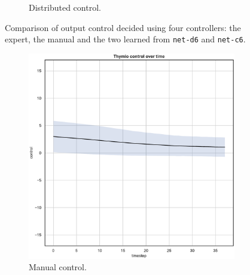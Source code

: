 \begin{figure}[!htb]
\begin{center}
\begin{subfigure}[h]{0.35\textwidth}
			\caption{Distributed control.}
		\end{subfigure}
	\end{center}
	\vspace{-0.5cm}
	\caption[Evaluation of the control decided by \texttt{net-c6}.]{Comparison of 
		output control decided using four controllers: the expert, the manual and the 
		two learned from \texttt{net-d6} and \texttt{net-c6}.}
\end{figure}

\medskip
\begin{figure}[!htb]\ContinuedFloat
	\begin{center}
		\begin{subfigure}[h]{0.35\textwidth}			
			\includegraphics[width=\textwidth]{contents/images/net-d6/control-overtime-manual}%
			\caption{Manual control.}
		\end{subfigure}
		\hspace{1cm}
		\begin{subfigure}[h]{0.35\textwidth}

\end{subfigure}
\end{center}
\end{figure}
